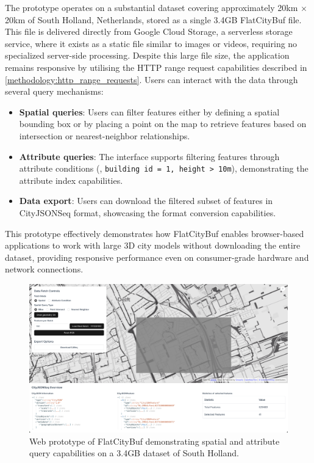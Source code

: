 The prototype operates on a substantial dataset covering approximately 20km $\times$ 20km of South Holland, Netherlands, stored as a single 3.4GB FlatCityBuf file. This file is delivered directly from Google Cloud Storage\citep{gcs}, a serverless storage service, where it exists as a static file similar to images or videos, requiring no specialized server-side processing. Despite this large file size, the application remains responsive by utilising the HTTP range request capabilities described in \autoref{methodology:http_range_requests}. Users can interact with the data through several query mechanisms:

\begin{itemize}
  \item \textbf{Spatial queries}: Users can filter features either by defining a spatial bounding box or by placing a point on the map to retrieve features based on intersection or nearest-neighbor relationships.

  \item \textbf{Attribute queries}: The interface supports filtering features through attribute conditions (\eg, \texttt{building id = 1, height > 10m}), demonstrating the attribute index capabilities.

  \item \textbf{Data export}: Users can download the filtered subset of features in CityJSONSeq format, showcasing the format conversion capabilities.
\end{itemize}

This prototype effectively demonstrates how FlatCityBuf enables browser-based applications to work with large 3D city models without downloading the entire dataset, providing responsive performance even on consumer-grade hardware and network connections.

\begin{figure}[ht]
  \centering
  \includegraphics[width=1.0\textwidth]{figs/result_analysis/web_prototype.png}
  \caption{Web prototype of FlatCityBuf demonstrating spatial and attribute query capabilities on a 3.4GB dataset of South Holland.}
  \label{fig:result:cross_platform_implementation:web_prototype}
\end{figure}

